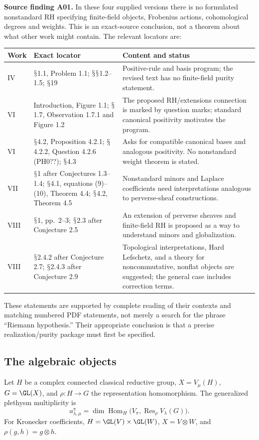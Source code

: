 \documentclass[11pt,a4paper]{article}
\newcommand{\Hom}{\operatorname{Hom}}\newcommand{\Spec}{\operatorname{Spec}}\newcommand{\Tr}{\operatorname{Tr}}\newcommand{\rank}{\operatorname{rank}}\newcommand{\Sym}{\operatorname{Sym}}\newcommand{\Res}{\operatorname{Res}}\newcommand{\IC}{\operatorname{IC}}\newcommand{\Gr}{\operatorname{Gr}}\newcommand{\Rep}{\operatorname{Rep}}\newcommand{\Frob}{\operatorname{Frob}}\newcommand{\End}{\operatorname{End}}
\renewcommand{\S}{\ensuremath{\mathsection}}
\theoremstyle{named}\newtheorem{finding}{Finding}[section]
\theoremstyle{definition}\newtheorem{definition}[finding]{Definition}
\theoremstyle{remark}\newtheorem{remark}[finding]{Remark}
\begin{document}
\textbf{Source finding A01.} In these four supplied versions there is no formulated nonstandard RH specifying finite-field objects, Frobenius actions, cohomological degrees and weights. This is an exact-source conclusion, not a theorem about what other work might contain. The relevant locators are:

{\small\begin{longtable}{p{.13\linewidth}p{.35\linewidth}p{.44\linewidth}}
\toprule Work&Exact locator&Content and status\\\midrule\endhead
IV&\S1.1, Problem 1.1; \S\S1.2--1.5; \S19&Positive-rule and basis program; the revised text has no finite-field purity statement.\\
VI&Introduction, Figure 1.1; \S1.7, Observation 1.7.1 and Figure 1.2&The proposed RH/extensions connection is marked by question marks; standard canonical positivity motivates the program.\\
VI&\S4.2, Proposition 4.2.1; \S4.2.2, Question 4.2.6 (PH0??); \S4.3&Asks for compatible canonical bases and analogous positivity. No nonstandard weight theorem is stated.\\
VII&\S1 after Conjectures 1.3--1.4; \S4.1, equations (9)--(10), Theorem 4.4; \S4.2, Theorem 4.5&Nonstandard minors and Laplace coefficients need interpretations analogous to perverse-sheaf constructions.\\
VIII&\S1, pp.~2--3; \S2.3 after Conjecture 2.5&An extension of perverse sheaves and finite-field RH is proposed as a way to understand minors and globalization.\\
VIII&\S2.4.2 after Conjecture 2.7; \S2.4.3 after Conjecture 2.9&Topological interpretations, Hard Lefschetz, and a theory for noncommutative, nonflat objects are suggested; the general case includes correction terms.\\\bottomrule
\end{longtable}}
These statements are supported by complete reading of their contexts and matching numbered PDF statements, not merely a search for the phrase ``Riemann hypothesis.'' Their appropriate conclusion is that a precise realization/purity package must first be specified.

\subsection{The algebraic objects}
Let $H$ be a complex connected classical reductive group, $X=V_\mu(H)$, $G=\GL(X)$, and $\rho:H\to G$ the representation homomorphism. The generalized plethysm multiplicity is
\begin{equation}\label{eq:plethysm}
a_{\lambda,\mu}^{\pi}=\dim\Hom_H\bigl(V_\pi,\Res_\rho V_\lambda(G)\bigr).
\end{equation}
For Kronecker coefficients, $H=\GL(V)\times\GL(W)$, $X=V\otimes W$, and $\rho(g,h)=g\otimes h$.
\end{document}

